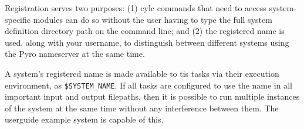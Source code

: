 Registration serves two purposes: (1) cylc commands that need to access
system-specific modules can do so without the user having to type the
full system definition directory path on the command line; and (2) the
registered name is used, along with your username, to distinguish
between different systems using the Pyro nameserver at the same time. 

A system's registered name is made available to tis tasks via their
execution environment, as \lstinline=$SYSTEM_NAME=. If all tasks are
configured to use the name in all important input and output filepaths,
then it is possible to run multiple instances of the system at the same
time without any interference between them. The userguide example system
is capable of this.
